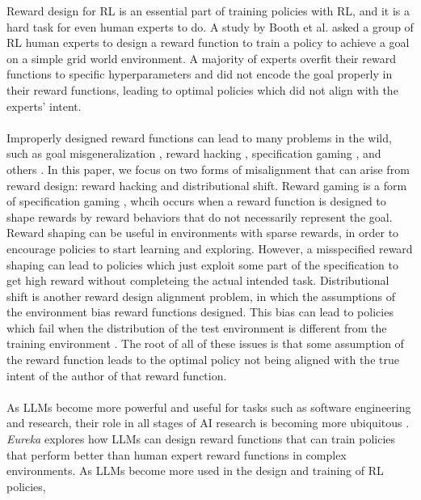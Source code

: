 \documentclass[11pt]{article}
\begin{document}
Reward design for RL is an essential part of training policies with RL, and it is a hard task for even human experts to do. A study by Booth et al. \cite{Boothperilsreward}
asked a group of RL human experts to design a reward function to train a policy to achieve a goal on a simple grid world environment. A majority of experts overfit their 
reward functions to specific hyperparameters and did not encode the goal properly in their reward functions, leading to optimal policies which did not align with the experts' intent.
\\\\
Improperly designed reward functions can lead to many problems in the wild, such as goal misgeneralization  \cite{shah2022goalmisgeneralizationcorrectspecifications}, reward hacking \cite{clark2016faultyrewardfunctions}, specification gaming \cite{krakovna2020specificationgaming}, and others \cite{Boothperilsreward}.
In this paper, we focus on two forms of misalignment that can arise from reward design: reward hacking and distributional shift. Reward gaming is a form of specification gaming \cite{krakovna2020specificationgaming}, whcih occurs when
a reward function is designed to shape rewards by reward behaviors that do not necessarily represent the goal. Reward shaping can be useful in environments with sparse rewards, in order to encourage policies to start learning
and exploring. However, a misspecified reward shaping can lead to policies which just exploit some part of the specification to get high reward without completeing the actual intended task. Distributional shift is another reward design alignment problem,
in which the assumptions of the environment bias reward functions designed. This bias can lead to policies which fail when the distribution of the test environment is different from the training environment \cite{leike2017aisafetygridworlds} \cite{Boothperilsreward}.
The root of all of these issues is that some assumption of the reward function leads to the optimal policy not being aligned with the true intent of the author of that reward function.
\\\\
As LLMs become more powerful and useful for tasks such as software engineering and research, their role in all stages of AI research is becoming more ubiquitous \cite{liang2025quantifyingllmusage} \cite{Jiang_2026}. \textit{Eureka} explores how
LLMs can design reward functions that can train policies that perform better than human expert reward functions in complex environments. As LLMs become more used in the design and training of RL policies,
\end{document}
